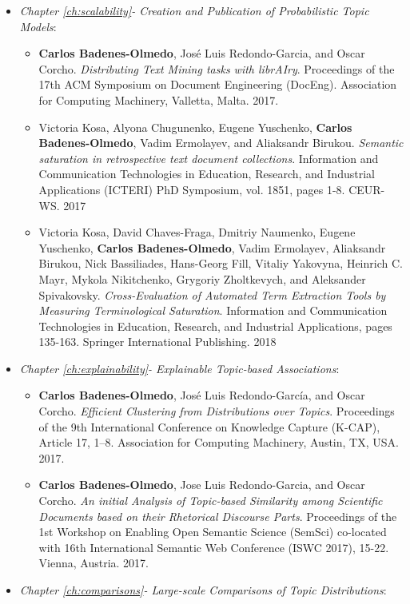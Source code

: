 \begin{itemize}
\item \textit{Chapter \ref{ch:scalability}- Creation and Publication of Probabilistic Topic Models}:
\begin{itemize}
\item \textbf{Carlos Badenes-Olmedo}, José Luis Redondo-Garcia, and Oscar Corcho. \textit{Distributing Text Mining tasks with librAIry}. Proceedings of the 17th ACM Symposium on Document Engineering (DocEng). Association for Computing Machinery, Valletta, Malta. 2017.
\item Victoria Kosa, Alyona Chugunenko, Eugene Yuschenko, \textbf{Carlos Badenes-Olmedo}, Vadim Ermolayev, and Aliaksandr Birukou. \textit{Semantic saturation in retrospective text document collections}. Information and Communication Technologies in Education, Research, and Industrial Applications (ICTERI) PhD Symposium, vol. 1851, pages 1-8. CEUR-WS. 2017
\item Victoria Kosa, David Chaves-Fraga, Dmitriy Naumenko, Eugene Yuschenko, \textbf{Carlos Badenes-Olmedo}, Vadim Ermolayev, Aliaksandr Birukou, Nick Bassiliades, Hans-Georg Fill, Vitaliy Yakovyna, Heinrich C. Mayr, Mykola Nikitchenko, Grygoriy Zholtkevych, and Aleksander Spivakovsky. \textit{Cross-Evaluation of Automated Term Extraction Tools by Measuring Terminological Saturation}. Information and Communication Technologies in Education, Research, and Industrial Applications, pages 135-163. Springer International Publishing. 2018
\end{itemize}
\item \textit{Chapter \ref{ch:explainability}- Explainable Topic-based Associations}:
\begin{itemize}
\item \textbf{Carlos Badenes-Olmedo}, José Luis Redondo-García, and Oscar Corcho. \textit{Efficient Clustering from Distributions over Topics}. Proceedings of the 9th International Conference on Knowledge Capture (K-CAP), Article 17, 1–8. Association for Computing Machinery, Austin, TX, USA. 2017.
\item \textbf{Carlos Badenes-Olmedo}, Jose Luis Redondo-Garcia, and Oscar Corcho. \textit{An initial Analysis of Topic-based Similarity among Scientific Documents based on their Rhetorical Discourse Parts}. Proceedings of the 1st Workshop on Enabling Open Semantic Science (SemSci) co-located with 16th International Semantic Web Conference (ISWC 2017), 15-22. Vienna, Austria. 2017.
\end{itemize}
\item \textit{Chapter \ref{ch:comparisons}- Large-scale Comparisons of Topic Distributions}:

\end{itemize}
